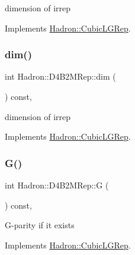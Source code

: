 dimension of irrep 

Implements \mbox{\hyperlink{structHadron_1_1CubicLGRep_a3acbaea26503ed64f20df693a48e4cdd}{Hadron\+::\+Cubic\+L\+G\+Rep}}.

\mbox{\label{structHadron_1_1D4B2MRep_ac21548568caf31696cb786877246f6a3}} 
\subsubsection{\texorpdfstring{dim()}{dim()}\hspace{0.1cm}{\footnotesize\ttfamily [3/3]}}
{\footnotesize\ttfamily int Hadron\+::\+D4\+B2\+M\+Rep\+::dim (\begin{DoxyParamCaption}{ }\end{DoxyParamCaption}) const\hspace{0.3cm}{\ttfamily [inline]}, {\ttfamily [virtual]}}

dimension of irrep 

Implements \mbox{\hyperlink{structHadron_1_1CubicLGRep_a3acbaea26503ed64f20df693a48e4cdd}{Hadron\+::\+Cubic\+L\+G\+Rep}}.

\mbox{\label{structHadron_1_1D4B2MRep_a144db6312f6d067b35490405af2f5873}} 
\subsubsection{\texorpdfstring{G()}{G()}\hspace{0.1cm}{\footnotesize\ttfamily [1/3]}}
{\footnotesize\ttfamily int Hadron\+::\+D4\+B2\+M\+Rep\+::G (\begin{DoxyParamCaption}{ }\end{DoxyParamCaption}) const\hspace{0.3cm}{\ttfamily [inline]}, {\ttfamily [virtual]}}

G-\/parity if it exists 

Implements \mbox{\hyperlink{structHadron_1_1CubicLGRep_ace26f7b2d55e3a668a14cb9026da5231}{Hadron\+::\+Cubic\+L\+G\+Rep}}.

\mbox{\label{structHadron_1_1D4B2MRep_a144db6312f6d067b35490405af2f5873}} 
